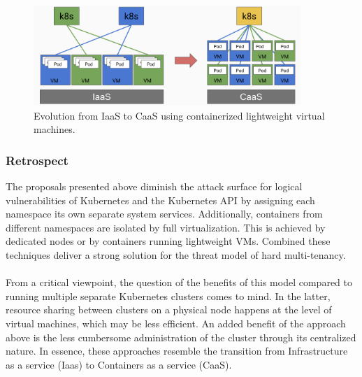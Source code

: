 \begin{figure}[H]
    \centering
    \includegraphics[width=0.9\textwidth]{chapter-related-work/images-hard/IaaS-to-CaaS.png}
    \caption{Evolution from IaaS to CaaS using containerized lightweight virtual machines.~\cite{kubernetes-deep-dive}}
    \label{fig:evolution}
\end{figure}

\subsubsection{Retrospect}
The proposals presented above diminish the attack surface for logical vulnerabilities of Kubernetes and the Kubernetes API by assigning each namespace its own separate system services. Additionally, containers from different namespaces are isolated by full virtualization. This is achieved by dedicated nodes or by containers running lightweight VMs. Combined these techniques deliver a strong solution for the threat model of hard multi-tenancy.\\\\
From a critical viewpoint, the question of the benefits of this model compared to running multiple separate Kubernetes clusters comes to mind. In the latter, resource sharing between clusters on a physical node happens at the level of virtual machines, which may be less efficient. An added benefit of the approach above is the less cumbersome administration of the cluster through its centralized nature. In essence, these approaches resemble the transition from Infrastructure as a service (Iaas) to Containers as a service (CaaS).
\newpage

